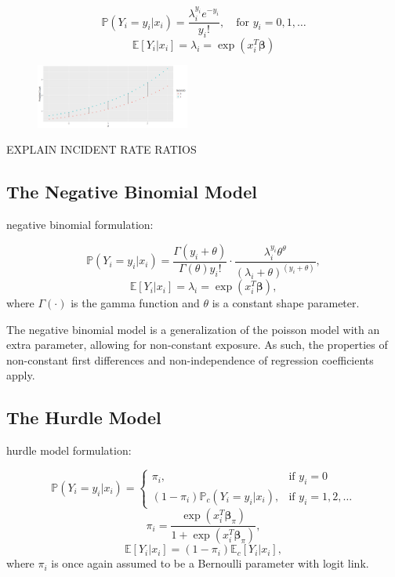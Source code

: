 \documentclass[jou, apacite]{apa6}
\begin{document}
\begin{equation} \label{pois1}
\mathbb{P}(Y_i = y_i|x_i) = \dfrac{\lambda_i^{y_i}e^{-y_i}}{y_i!}, \quad\text{for } y_i = 0, 1, \dots
\end{equation}
\begin{equation} \label{pois2}
\mathbb{E}[Y_i|x_i] = \lambda_i = \exp (x_i^T \bm{\beta})
\end{equation}

\begin{figure}[h]
\includegraphics[width=0.45\textwidth]{PoissonFirstDiff.png}
\end{figure}
EXPLAIN INCIDENT RATE RATIOS

\subsection{The Negative Binomial Model}

negative binomial formulation:

\begin{equation}
\mathbb{P}(Y_i = y_i | x_i) = \dfrac{\Gamma(y_i + \theta)}{\Gamma(\theta)y_i!}
  \cdot
  \dfrac{\lambda_i^{y_i}\theta^{\theta}}{(\lambda_i + \theta)^{(y_i + \theta)}},
\end{equation}
\begin{equation}
\mathbb{E}[Y_i|x_i] = \lambda_i = \exp (x_i^T \bm{\beta}),
\end{equation}
where $\Gamma(\cdot)$ is the gamma function and $\theta$ is a constant shape parameter.

The negative binomial model is a generalization of the poisson model with an extra parameter, allowing for non-constant exposure. As such, the properties of non-constant first differences and non-independence of regression coefficients apply. 


\subsection{The Hurdle Model}

hurdle model formulation:

\begin{equation}
\mathbb{P}(Y_i = y_i|x_i) =
  \begin{cases}
    \pi_i, & \text{if } y_i = 0 \\
    (1 - \pi_i)\mathbb{P}_c(Y_i = y_i|x_i), & \text{if } y_i = 1, 2, \dots
  \end{cases}
\end{equation}
\begin{equation}
\pi_i = \dfrac{\exp (x_i^T \bm{\beta}_{\pi})}{1 + \exp (x_i^T \bm{\beta}_{\pi})},
\end{equation}
\begin{equation}
\mathbb{E}[Y_i|x_i] = (1 - \pi_i)\mathbb{E}_c[Y_i|x_i], %
\end{equation}
where $\pi_i$ is once again assumed to be a Bernoulli parameter with logit link.
\end{document}
